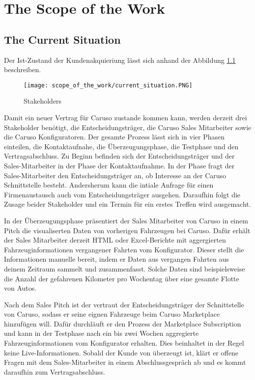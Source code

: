\chapter{The Scope of the Work}
\section{The Current Situation}
Der Ist-Zustand der Kundenakquieriung lässt sich anhand der Abbildung \ref{ScopeOfWork:Situation} beschreiben.
\begin{figure}[ht]
  \centering
  \texttt{[image: scope\_of\_the\_work/current\_situation.PNG]}
  \caption{Stakeholders}
  \label{ScopeOfWork:Situation}
\end{figure}
Damit ein neuer Vertrag für Caruso zustande kommen kann, werden derzeit drei Stakeholder benötigt, die Entscheidungsträger, die Caruso Sales Mitarbeiter sowie die Caruso Konfiguratoren. Der gesamte Prozess lässt sich in vier Phasen einteilen, die Kontaktaufnahe, die Überzeugungsphase, die Testphase und den Vertragsabschluss.
Zu Beginn befinden sich der Entscheidungsträger und der Sales-Mitarbeiter in der Phase der Kontaktaufnahme. In der Phase fragt der Sales-Mitarbeiter den Entscheidungsträger an, ob Interesse an der Caruso Schnittstelle besteht. Andersherum kann die intiale Anfrage für einen Firmenaustausch auch vom Entscheidungsträger ausgehen. Daraufhin folgt die Zusage beider Stakeholder und ein Termin für ein erstes Treffen wird ausgemacht.

In der Überzeugungsphase präsentiert der Sales Mitarbeiter von Caruso in einem Pitch die visualiserten Daten von vorherigen Fahrzeugen bei Caruso. Dafür erhält der Sales Mitarbeiter derzeit HTML oder Excel-Berichte mit aggergierten Fahrzeuginformationen vergangener Fahrten vom Konfigurator. Dieser stellt die Informationen manuelle bereit, indem er Daten aus vergangen Fahrten aus deinem Zeitraum sammelt und zusammenfasst. Solche Daten sind beispielsweise die Anzahl der gefahrenen Kilometer pro Wochentag über eine gesamte Flotte von Autos.

Nach dem Sales Pitch ist der vertraut der Entscheidungsträger der Schnittstelle von Caruso, sodass er seine eignen Fahrzeuge beim Caruso Marketplace hinzufügen will. Dafür durchläuft er den Prozess der Marketplace Subscription und kann in der Testphase nach ein bis zwei Wochen aggregierte Fahrzeuginformationen vom Konfigurator erhalten. Dies beinhaltet in der Regel keine Live-Informationen.
Sobald der Kunde von überzeugt ist, klärt er offene Fragen mit dem Sales-Mitarbeiter in einem Abschlussgespräch ab und es kommt daraufhin zum Vertragsabschluss.

